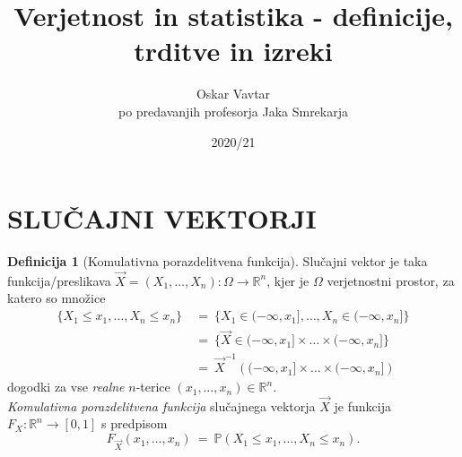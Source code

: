 \documentclass[11pt]{article}
\title{Verjetnost in statistika - definicije, trditve in izreki}
\author{Oskar Vavtar \\
po predavanjih profesorja Jaka Smrekarja}
\date{2020/21}
\newcommand{\1}{\mathbbm{1}}
\theoremstyle{definition}
\newtheorem{definicija}{Definicija}[section]
\theoremstyle{definition}
\theoremstyle{definition}
\begin{document}
\maketitle
\pagebreak
\tableofcontents
\pagebreak


\section{SLUČAJNI VEKTORJI}
\vspace{0.5cm}

\begin{definicija}[Komulativna porazdelitvena funkcija]

Slučajni vektor je taka funkcija/preslikava $\vec{X} = (X_1, \ldots, X_n): \Omega \rightarrow \mathbb{R}^n$, kjer je $\Omega$ verjetnostni prostor, za katero so množice
\begin{align*}
\{ X_1 \leq x_1, \ldots, X_n \leq x_n \} ~&=~ \{ X_1 \in (-\infty, x_1], \ldots, X_n \in (-\infty, x_n] \} \\
&=~ \{ \vec{X} \in (-\infty, x_1] \times \ldots \times (-\infty, x_n] \} \\
&=~ {\vec{X}}^{-1} \left( (-\infty, x_1] \times \ldots \times (-\infty, x_n] \right)
\end{align*}
dogodki za vse \textit{realne} $n$-terice $(x_1, \ldots, x_n) \in \mathbb{R}^n$. \\

\noindent \textit{Komulativna porazdelitvena funkcija} slučajnega vektorja $\vec{X}$ je funkcija $F_X: \mathbb{R}^n \rightarrow [0, 1]$ s predpisom
$$F_{\vec{X}}(x_1, \ldots, x_n) ~=~ \mathbb{P}(X_1 \leq x_1, \ldots, X_n \leq x_n).$$

\end{definicija}
\vspace{0.5cm}
\end{document}
